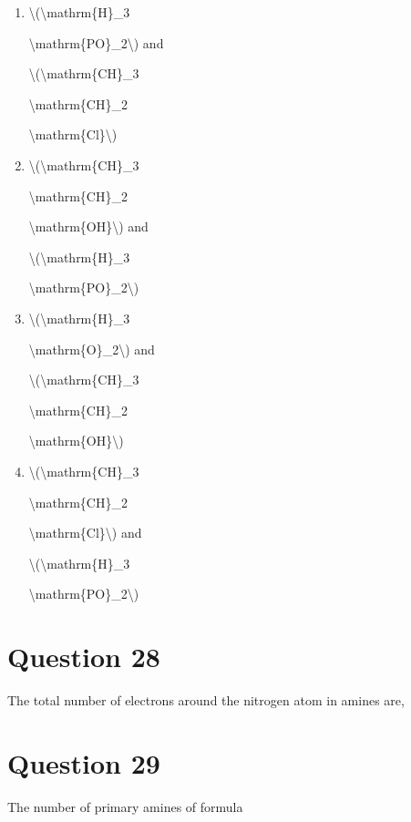 \documentclass{article}
\begin{document}
\begin{enumerate}[label=(\alph*)]
\item \textbackslash(\textbackslash mathrm\{H\}\_3

\textbackslash mathrm\{PO\}\_2\textbackslash) and

\textbackslash(\textbackslash mathrm\{CH\}\_3

\textbackslash mathrm\{CH\}\_2

\textbackslash mathrm\{Cl\}\textbackslash)


\item \textbackslash(\textbackslash mathrm\{CH\}\_3

\textbackslash mathrm\{CH\}\_2

\textbackslash mathrm\{OH\}\textbackslash) and

\textbackslash(\textbackslash mathrm\{H\}\_3

\textbackslash mathrm\{PO\}\_2\textbackslash)


\item \textbackslash(\textbackslash mathrm\{H\}\_3

\textbackslash mathrm\{O\}\_2\textbackslash) and

\textbackslash(\textbackslash mathrm\{CH\}\_3

\textbackslash mathrm\{CH\}\_2

\textbackslash mathrm\{OH\}\textbackslash)


\item \textbackslash(\textbackslash mathrm\{CH\}\_3

\textbackslash mathrm\{CH\}\_2

\textbackslash mathrm\{Cl\}\textbackslash) and

\textbackslash(\textbackslash mathrm\{H\}\_3

\textbackslash mathrm\{PO\}\_2\textbackslash)


\end{enumerate}
\newpage
\section*{Question 28}
The total number of electrons around the nitrogen atom in amines are,


\begin{enumerate}[label=(\alph*)]
\end{enumerate}
\newpage
\section*{Question 29}
The number of primary amines of formula
\end{document}
